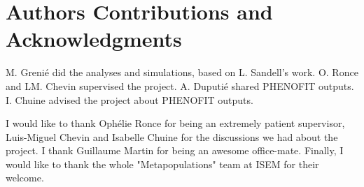 \label{sec:Ack}
\section*{Authors Contributions and Acknowledgments}

M. Grenié did the analyses and simulations, based on L. Sandell's work. O. Ronce and LM. Chevin supervised the project. A. Duputié shared \textsc{PHENOFIT} outputs. I. Chuine advised the project about \textsc{PHENOFIT} outputs.

I would like to thank Ophélie Ronce for being an extremely patient supervisor, Luis-Miguel Chevin and Isabelle Chuine for the discussions we had about the project. I thank Guillaume Martin for being an awesome office-mate. Finally, I would like to thank the whole "Metapopulations" team at ISEM for their welcome.